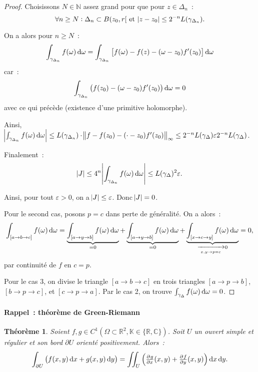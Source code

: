 \documentclass{report}
\newtheorem{thm}{Théorème}[chapter]
\theoremstyle{definition}
\theoremstyle{remark}
\numberwithin{equation}{section}
\newcommand{\K}{\mathbb K}
\newcommand{\C}{\mathbb C}
\newcommand{\R}{\mathbb R}
\newcommand{\N}{\mathbb N}
\begin{document}
\begin{proof}
			Choisissons $N \in \N$ assez grand pour que pour $z \in \Delta_n$~:
			\begin{equation}
				\forall n \geq N : \Delta_n \subset B(z_0, r[ \text{ et } \abs {z-z_0} \leq 2^{-n}L(\gamma_{\Delta_n}).
			\end{equation}

			On a alors pour $n \geq N$~:
			\begin{equation}
				\int_{\gamma_{\Delta_n}}f(\omega)\dif \omega = \int_{\gamma_{\Delta_n}}\left[f(\omega) - f(z) - (\omega-z_0)f'(z_0)\right]\dif \omega
			\end{equation}
			car~:
			\begin{equation}
				\int_{\gamma_{\Delta_n}}\left(f(z_0) - (\omega-z_0)f'(z_0)\right)\dif \omega = 0
			\end{equation}
			avec ce qui précède (existence d'une primitive holomorphe).

			Ainsi, $\abs {\int_{\gamma_{\Delta_n}}f(\omega)\dif \omega} \leq L(\gamma_{\Delta_n})\cdot \norm {f-f(z_0) - (\cdot-z_0)f'(z_0)}_\infty
			\leq 2^{-n}L(\gamma_\Delta)\varepsilon2^{-n}L(\gamma_\Delta)$.

			Finalement~:
			\begin{equation}
				\abs J \leq 4^n\abs {\int_{\gamma_{\Delta_n}}f(\omega)\dif \omega} \leq L(\gamma_\Delta)^2\varepsilon.
			\end{equation}

			Ainsi, pour tout $\varepsilon > 0$, on a $\abs J \leq \varepsilon$. Donc $\abs J = 0$.

			Pour le second cas, posons $p = c$ dans perte de généralité. On a alors~:
			\begin{equation}
				\int_{[a \to b \to c]}f(\omega)\dif \omega = \underbrace {\int_{[a \to y \to b]}f(\omega)\dif \omega}_{= 0}
					+ \underbrace {\int_{[a \to y \to b]} f(\omega)\dif \omega}_{= 0}
					+ \underbrace {\int_{[x \to c \to y]}f(\omega)\dif \omega}_{\xrightarrow[x, y \to p=c]{} 0} = 0,
			\end{equation}
			par continuité de $f$ en $c=p$.

			Pour le cas 3, on divise le triangle $[a \to b \to c]$ en trois triangles $[a \to p \to b]$, $[b \to p \to c]$, et $[c \to p \to a]$.
			Par le cas 2, on trouve $\int_{\gamma_\Delta} f(\omega)\dif \omega = 0$.
			\end{proof}

			\paragraph{Rappel~: théorème de Green-Riemann}
				\begin{thm} Soient $f, g \in C^1\left(\Omega \subset \R^2, \K \in \{\R, \C\}\right)$. Soit $U$ un ouvert \textit{simple} et \textit{régulier} et son bord
				$\partial U$ orienté positivement. Alors~:
				\begin{equation}
					\int_{\partial U}\left(f(x, y)\dif x + g(x, y)\dif y\right) = \iint_U\left(\pd gx(x, y) + \pd fy(x, y)\right)\dif x\dif y.
				\end{equation}
				\end{thm}
\end{document}
